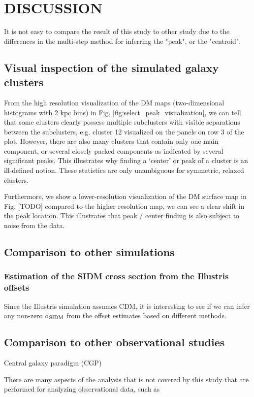 \section{DISCUSSION}\label{sec:discussion}
It is not easy to compare the result of this study to other study due to the 
differences in the multi-step method for inferring the "peak", or the
"centroid".

\subsection{Visual inspection of the simulated galaxy clusters}
From the high resolution visualization of the DM maps (two-dimensional
histograms with 2 kpc bins) in 
Fig. \ref{fig:select_peak_visualization}, we can tell that some clusters clearly
possess multiple subclusters with visible separations between the subclusters, e.g. cluster 12 visualized on the panels on row 3 
of the plot. 
However, there are also many clusters that contain  
only one main component, or several closely packed components as indicated by
several significant peaks. 
This illustrates why finding a `center' or peak of a cluster is an ill-defined 
notion. These statistics are only unambiguous for symmetric, relaxed 
clusters.  

Furthermore, we show a lower-resolution visualization of the DM surface
map in Fig. [TODO] compared to the higher resolution map, we can see a clear
shift in the peak location. This illustrates that peak / center finding is also
subject to noise from the data.

\subsection{Comparison to other simulations}
\subsubsection{Estimation of the SIDM cross section from the Illustris offsets}
Since the Illustris simulation assumes CDM, it is interesting to see if we can
infer any non-zero $\sigma_{\rm SIDM}$ from the offset estimates based on
different methods.  

\subsection{Comparison to other observational studies}
Central galaxy paradigm (CGP)


There are many aspects of the analysis that is not covered by this study that
are performed for analyzing observational data, such as 

